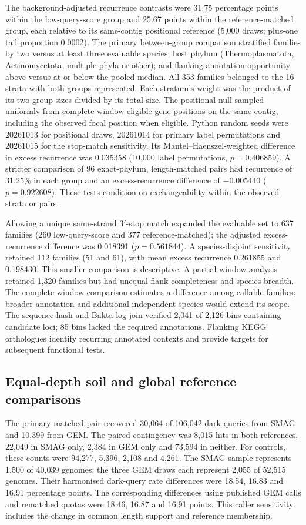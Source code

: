 \documentclass[11pt]{article}
\begin{document}
The background-adjusted recurrence contrasts were 31.75 percentage points within the
low-query-score group and 25.67 points within the reference-matched group, each relative to
its same-contig positional reference (5{,}000 draws; plus-one tail proportion 0.0002).
The primary between-group comparison stratified families by two versus at least three
evaluable species; host phylum (Thermoplasmatota, Actinomycetota, multiple phyla or other);
and flanking annotation opportunity above versus at or below the pooled median. All 353
families belonged to the 16 strata with both groups represented. Each stratum's weight was
the product of its two group sizes divided by its total size. The positional null sampled
uniformly from complete-window-eligible gene positions on the same contig, including the
observed focal position when eligible. Python random seeds were 20261013 for positional draws,
20261014 for primary label permutations and 20261015 for the stop-match sensitivity. Its Mantel--Haenszel-weighted difference in excess recurrence was
0.035358 (10{,}000 label permutations, $p=0.406859$). A stricter comparison of 96 exact-phylum,
length-matched pairs had recurrence of 31.25\% in each group and an excess-recurrence difference
of $-0.005440$ ($p=0.922608$). These tests condition on exchangeability within the observed
strata or pairs.

Allowing a unique same-strand 3$'$-stop match expanded the evaluable set to 637 families
(260 low-query-score and 377 reference-matched); the adjusted excess-recurrence difference
was 0.018391 ($p=0.561844$). A species-disjoint sensitivity retained 112 families
(51 and 61), with mean excess recurrence 0.261855 and 0.198430. This smaller comparison is
descriptive. A partial-window analysis retained 1{,}320 families but had unequal flank
completeness and species breadth. The complete-window comparison estimates a difference among
callable families; broader annotation and additional independent species would extend its scope.
The sequence-hash and Bakta-log join verified 2{,}041 of 2{,}126 bins containing candidate loci;
85 bins lacked the required annotations. Flanking KEGG orthologues identify recurring annotated
contexts and provide targets for subsequent functional tests.

\subsection*{Equal-depth soil and global reference comparisons}
The primary matched pair recovered 30{,}064 of 106{,}042 dark queries from SMAG and 10{,}399
from GEM. The paired contingency was 8{,}015 hits in both references, 22{,}049 in SMAG only,
2{,}384 in GEM only and 73{,}594 in neither. For controls, these counts were 94{,}277,
5{,}396, 2{,}108 and 4{,}261. The SMAG sample represents 1{,}500 of 40{,}039 genomes;
the three GEM draws each represent 2{,}055 of 52{,}515 genomes. Their harmonised dark-query
rate differences were 18.54, 16.83 and 16.91 percentage points. The corresponding differences
using published GEM calls and rematched quotas were 18.46, 16.87 and 16.91 points.
This caller sensitivity includes the change in common length support and reference membership.
\end{document}
